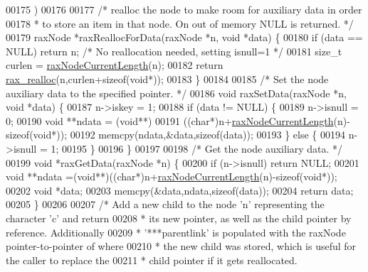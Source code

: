 \begin{DoxyCode}
{00175 \textcolor{preprocessor}{)}
00176 
00177 \textcolor{comment}{/* realloc the node to make room for auxiliary data in order}
00178 \textcolor{comment}{ * to store an item in that node. On out of memory NULL is returned. */}
00179 raxNode *raxReallocForData(raxNode *n, \textcolor{keywordtype}{void} *data) \{
00180     \textcolor{keywordflow}{if} (data == NULL) \textcolor{keywordflow}{return} n; \textcolor{comment}{/* No reallocation needed, setting isnull=1 */}
00181     size\_t curlen = \hyperlink{rax_8c_a93300b0f45c900ba0bdb80f3f7a83f5e}{raxNodeCurrentLength}(n);
00182     \textcolor{keywordflow}{return} \hyperlink{rax__malloc_8h_a4aa041a0e1eaa6d8476e889547280467}{rax\_realloc}(n,curlen+\textcolor{keyword}{sizeof}(\textcolor{keywordtype}{void}*));
00183 \}
00184 
00185 \textcolor{comment}{/* Set the node auxiliary data to the specified pointer. */}
00186 \textcolor{keywordtype}{void} raxSetData(raxNode *n, \textcolor{keywordtype}{void} *data) \{
00187     n->iskey = 1;
00188     \textcolor{keywordflow}{if} (data != NULL) \{
00189         n->isnull = 0;
00190         \textcolor{keywordtype}{void} **ndata = (\textcolor{keywordtype}{void}**)
00191             ((\textcolor{keywordtype}{char}*)n+\hyperlink{rax_8c_a93300b0f45c900ba0bdb80f3f7a83f5e}{raxNodeCurrentLength}(n)-\textcolor{keyword}{sizeof}(\textcolor{keywordtype}{void}*));
00192         memcpy(ndata,&data,\textcolor{keyword}{sizeof}(data));
00193     \} \textcolor{keywordflow}{else} \{
00194         n->isnull = 1;
00195     \}
00196 \}
00197 
00198 \textcolor{comment}{/* Get the node auxiliary data. */}
00199 \textcolor{keywordtype}{void} *raxGetData(raxNode *n) \{
00200     \textcolor{keywordflow}{if} (n->isnull) \textcolor{keywordflow}{return} NULL;
00201     \textcolor{keywordtype}{void} **ndata =(\textcolor{keywordtype}{void}**)((\textcolor{keywordtype}{char}*)n+\hyperlink{rax_8c_a93300b0f45c900ba0bdb80f3f7a83f5e}{raxNodeCurrentLength}(n)-\textcolor{keyword}{sizeof}(\textcolor{keywordtype}{void}*));
00202     \textcolor{keywordtype}{void} *data;
00203     memcpy(&data,ndata,\textcolor{keyword}{sizeof}(data));
00204     \textcolor{keywordflow}{return} data;
00205 \}
00206 
00207 \textcolor{comment}{/* Add a new child to the node 'n' representing the character 'c' and return}
00208 \textcolor{comment}{ * its new pointer, as well as the child pointer by reference. Additionally}
00209 \textcolor{comment}{ * '***parentlink' is populated with the raxNode pointer-to-pointer of where}
00210 \textcolor{comment}{ * the new child was stored, which is useful for the caller to replace the}
00211 \textcolor{comment}{ * child pointer if it gets reallocated.}
}
\end{DoxyCode}
